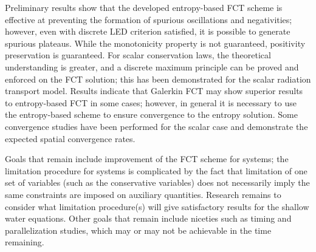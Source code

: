 Preliminary results show that the developed entropy-based FCT scheme
is effective at preventing the formation of spurious oscillations and
negativities; however, even with discrete LED criterion satisfied, it is
possible to generate spurious plateaus. While the monotonicity property is
not guaranteed, positivity preservation is guaranteed.
For scalar conservation laws,
the theoretical understanding
is greater, and a discrete maximum principle can be proved and enforced
on the FCT solution; this has been demonstrated for the scalar radiation
transport model. Results indicate that Galerkin FCT may show superior
results to entropy-based FCT in some cases; however, in general it is
necessary to use the entropy-based scheme to ensure convergence to the
entropy solution.
Some convergence studies have been performed for the scalar case and
demonstrate the expected spatial convergence rates.

Goals that remain include improvement of the FCT scheme for systems;
the limitation procedure for systems is complicated by the fact that
limitation of one set of variables (such as the conservative variables)
does not necessarily imply the same constraints are imposed on
auxiliary quantities. Research remains to consider what limitation
procedure(s) will give satisfactory results for the shallow water
equations. Other goals that remain include niceties such as timing
and parallelization studies, which may or may not be achievable in
the time remaining.
